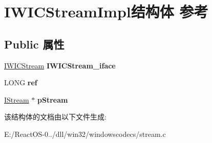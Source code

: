 \hypertarget{struct_i_w_i_c_stream_impl}{}\section{I\+W\+I\+C\+Stream\+Impl结构体 参考}
\label{struct_i_w_i_c_stream_impl}
\subsection*{Public 属性}
\begin{DoxyCompactItemize}
\item 
\mbox{\label{struct_i_w_i_c_stream_impl_a9066fc6a8cc8072f2671052f25c826ec}} 
\hyperlink{interface_i_w_i_c_stream}{I\+W\+I\+C\+Stream} {\bfseries I\+W\+I\+C\+Stream\+\_\+iface}
\item 
\mbox{\label{struct_i_w_i_c_stream_impl_ac5fbcf18f3274e2a90e200518bddb159}} 
L\+O\+NG {\bfseries ref}
\item 
\mbox{\label{struct_i_w_i_c_stream_impl_a3505aa766bdc109a394d7ae640ea1c55}} 
\hyperlink{interface_i_stream}{I\+Stream} $\ast$ {\bfseries p\+Stream}
\end{DoxyCompactItemize}


该结构体的文档由以下文件生成\+:\begin{DoxyCompactItemize}
\item 
E\+:/\+React\+O\+S-\/0../dll/win32/windowscodecs/stream.\+c\end{DoxyCompactItemize}
